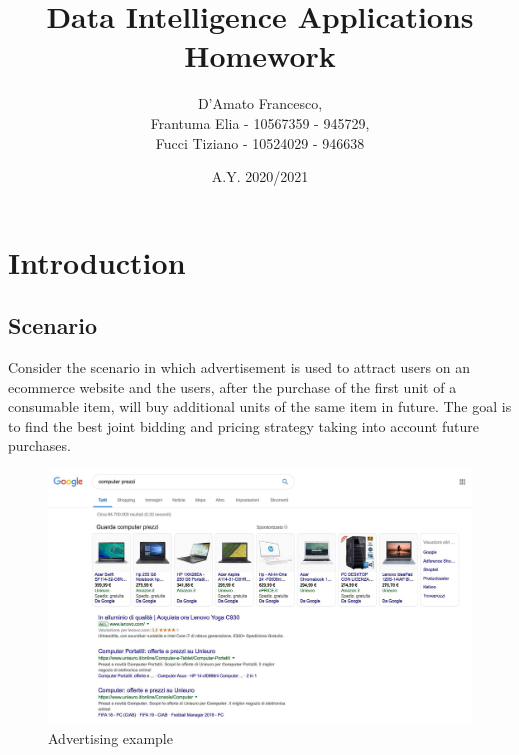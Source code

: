 \documentclass[12pt,a4paper]{report}
\title{Data Intelligence Applications Homework}
\author{D'Amato Francesco, \\
	Frantuma Elia - 10567359 - 945729, \\
	Fucci Tiziano - 10524029 - 946638}
\date{A.Y. 2020/2021}
\begin{document}
	\maketitle
	\tableofcontents
	\chapter{Introduction}
		\section{Scenario}
			Consider the scenario in which advertisement is used to attract users on an ecommerce website and the users, after the purchase of the first unit of a consumable item, will buy additional units of the same item in future. The goal is to find the best joint bidding and pricing strategy taking into account future purchases.

\begin{figure}[H]
\centering
  \includegraphics[scale = 0.3, center]{image0}
  \caption{Advertising example}
\end{figure}
\end{document}
